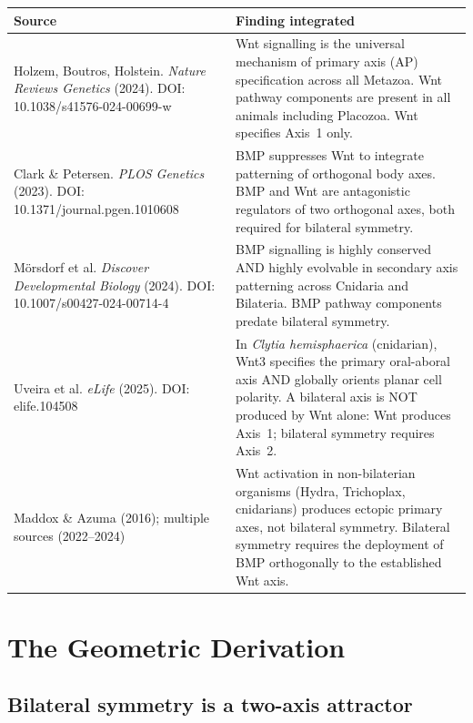 \documentclass[12pt, a4paper]{article}
\theoremstyle{definition}
\theoremstyle{remark}
\begin{document}
\begin{center}
\begin{tabular}{p{4.5cm}p{7cm}}
\toprule
\textbf{Source} & \textbf{Finding integrated} \\
\midrule
Holzem, Boutros, Holstein.
\textit{Nature Reviews Genetics} (2024).
DOI: 10.1038/s41576-024-00699-w
  & Wnt signalling is the universal mechanism of
    primary axis (AP) specification across all Metazoa.
    Wnt pathway components are present in all animals
    including Placozoa. Wnt specifies Axis~1 only. \\
\addlinespace
Clark \& Petersen.
\textit{PLOS Genetics} (2023).
DOI: 10.1371/journal.pgen.1010608
  & BMP suppresses Wnt to integrate patterning of
    orthogonal body axes. BMP and Wnt are antagonistic
    regulators of two orthogonal axes, both required
    for bilateral symmetry. \\
\addlinespace
M\"{o}rsdorf et al.
\textit{Discover Developmental Biology} (2024).
DOI: 10.1007/s00427-024-00714-4
  & BMP signalling is highly conserved AND highly
    evolvable in secondary axis patterning across
    Cnidaria and Bilateria. BMP pathway components
    predate bilateral symmetry. \\
\addlinespace
Uveira et al.
\textit{eLife} (2025).
DOI: elife.104508
  & In \textit{Clytia hemisphaerica} (cnidarian),
    Wnt3 specifies the primary oral-aboral axis AND
    globally orients planar cell polarity. A bilateral
    axis is NOT produced by Wnt alone: Wnt produces
    Axis~1; bilateral symmetry requires Axis~2. \\
\addlinespace
Maddox \& Azuma (2016); multiple sources (2022--2024)
  & Wnt activation in non-bilaterian organisms
    (Hydra, Trichoplax, cnidarians) produces
    ectopic primary axes, not bilateral symmetry.
    Bilateral symmetry requires the deployment of
    BMP orthogonally to the established Wnt axis. \\
\bottomrule
\end{tabular}
\end{center}

\section{The Geometric Derivation}

\subsection{Bilateral symmetry is a two-axis attractor}
\end{document}

